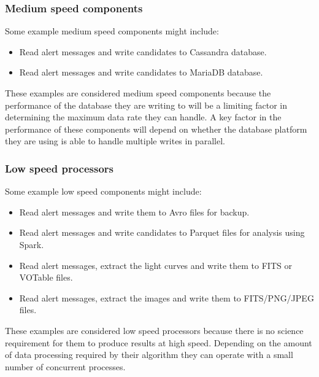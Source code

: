 \documentclass{article}
\newcommand{\avro} {Avro\xspace}
\newcommand{\fits} {FITS\xspace}
\newcommand{\parquet} {Parquet\xspace}
\newcommand{\votable} {VOTable\xspace}
\newcommand{\spark} {Spark\xspace}
\newcommand{\cassandra} {Cassandra\xspace}
\newcommand{\mariadb} {MariaDB\xspace}
\newcommand{\phasea} {phase A\xspace}
\newcommand{\lsstuk} {LSST:UK\xspace}
\begin{document}
\subsubsection{Medium speed components}
\label{stage-2.medium-speed.components}

Some example medium speed components might include:
\begin{itemize}
  \item Read alert messages and write candidates to \cassandra database.
  \item Read alert messages and write candidates to \mariadb database.
\end{itemize}

These examples are considered medium speed components because the performance of the database they are writing to will be a limiting factor in determining the maximum data rate they can handle. A key factor in the performance of these components will depend on whether the database platform they are using is able to handle multiple writes in parallel.


\subsubsection{Low speed processors}
\label{stage-2.low-speed.processors}

Some example low speed components might include:
\begin{itemize}
  \item Read alert messages and write them to \avro files for backup.
  \item Read alert messages and write candidates to \parquet files for analysis using \spark.
  \item Read alert messages, extract the light curves and write them to \fits or \votable files.
  \item Read alert messages, extract the images and write them to FITS/PNG/JPEG files.
\end{itemize}

These examples are considered low speed processors because there is no science requirement for them to produce results at high speed. Depending on the amount of data processing required by their algorithm they can operate with a small number of concurrent processes.
\end{document}
